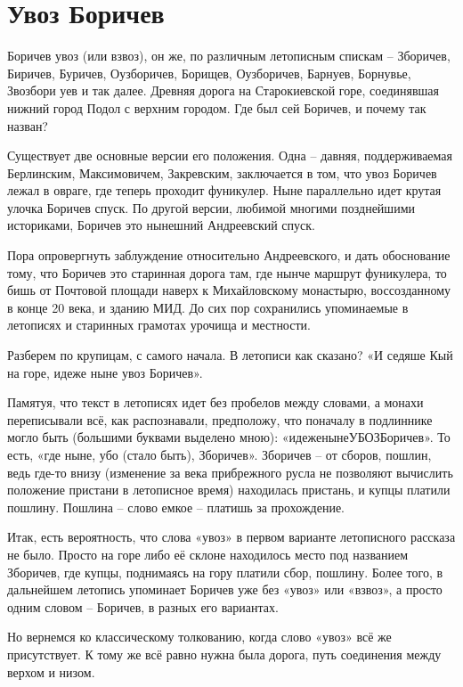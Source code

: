 \chapter {Увоз Боричев}

Боричев увоз (или взвоз), он же, по различным летописным спискам – Зборичев, Биричев, Буричев, Оузборичев, Борищев, Оузборичев, Барнуев, Борнувье, Звозбори уев и так далее. Древняя дорога на Старокиевской горе, соединявшая нижний город Подол с верхним городом. Где был сей Боричев, и почему так назван?

Существует две основные версии его положения. Одна – давняя, поддерживаемая Берлинским, Максимовичем, Закревским, заключается в том, что увоз Боричев лежал в овраге, где теперь проходит фуникулер. Ныне параллельно идет крутая улочка Боричев спуск. По другой версии, любимой многими позднейшими историками, Боричев это нынешний Андреевский спуск.

Пора опровергнуть заблуждение относительно Андреевского, и дать обоснование тому, что Боричев это старинная дорога там, где нынче маршрут фуникулера, то бишь от Почтовой площади наверх к Михайловскому монастырю, воссозданному в конце 20 века, и зданию МИД. До сих пор сохранились упоминаемые в летописях и старинных грамотах урочища и местности.

Разберем по крупицам, с самого начала. В летописи как сказано? «И седяше Кый на горе, идеже ныне увоз Боричев».

Памятуя, что текст в летописях идет без пробелов между словами, а монахи переписывали всё, как распознавали, предположу, что поначалу в подлиннике могло быть (большими буквами выделено мною): «идеженынеУБОЗБоричев». То есть, «где ныне, убо (стало быть), Зборичев». Зборичев – от сборов, пошлин, ведь где-то внизу (изменение за века прибрежного русла не позволяют вычислить положение пристани в летописное время) находилась пристань, и купцы платили пошлину. Пошлина – слово емкое – платишь за прохождение.

Итак, есть вероятность, что слова «увоз» в первом варианте летописного рассказа не было. Просто на горе либо её склоне находилось место под названием Зборичев, где купцы, поднимаясь на гору платили сбор, пошлину. Более того, в дальнейшем летопись упоминает Боричев уже без «увоз» или «взвоз», а просто одним словом – Боричев, в разных его вариантах.

Но вернемся ко классическому толкованию, когда слово «увоз» всё же присутствует. К тому же всё равно нужна была дорога, путь соединения между верхом и низом.

